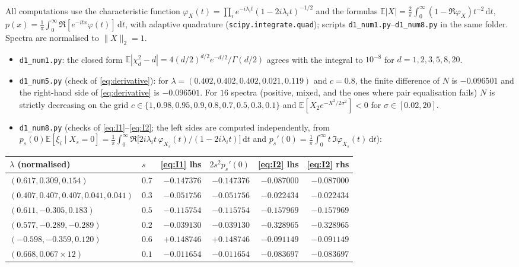 \documentclass[11pt]{article}
\theoremstyle{remark}
\newcommand{\E}{\mathbb{E}}
\newcommand{\dd}{\,\mathrm{d}}
\begin{document}
All computations use the characteristic function $\varphi_X(t)=\prod_i e^{-i\lambda_it}(1-2i\lambda_it)^{-1/2}$ and the formulas
$\E|X|=\frac2\pi\int_0^\infty(1-\Re\varphi_X)t^{-2}\dd t$, $p(x)=\frac1\pi\int_0^\infty\Re[e^{-itx}\varphi(t)]\dd t$, with adaptive quadrature
(\texttt{scipy.integrate.quad}); scripts \texttt{d1\_num1.py}--\texttt{d1\_num8.py} in the same folder. Spectra are normalised to $\|X\|_2=1$.
\begin{itemize}
\item \texttt{d1\_num1.py}: the closed form $\E|\chi_d^2-d|=4(d/2)^{d/2}e^{-d/2}/\Gamma(d/2)$ agrees with the integral to $10^{-8}$ for $d=1,2,3,5,8,20$.
\item \texttt{d1\_num5.py} (check of \eqref{eq:derivative}): for $\lambda=(0.402,0.402,0.402,0.021,0.119)$ and $c=0.8$, the finite difference of
$N$ is $-0.096501$ and the right-hand side of \eqref{eq:derivative} is $-0.096501$. For $16$ spectra (positive, mixed, and the ones where pair
equalisation fails) $N$ is strictly decreasing on the grid $c\in\{1,0.98,0.95,0.9,0.8,0.7,0.5,0.3,0.1\}$ and $\E[X_2e^{-X^2/2\sigma^2}]<0$ for
$\sigma\in[0.02,20]$.
\item \texttt{d1\_num8.py} (checks of \eqref{eq:I1}--\eqref{eq:I2}; the left sides are computed independently, from
$p_s(0)\E[\xi_i\mid X_s=0]=\frac1\pi\int_0^\infty\Re\big[2i\lambda_it\,\varphi_{X_s}(t)/(1-2i\lambda_it)\big]\dd t$ and
$p_s'(0)=\frac1\pi\int_0^\infty t\,\Im\varphi_{X_s}(t)\dd t$):
\end{itemize}
\begin{center}\small
\begin{tabular}{llrrrr}
\toprule
$\lambda$ (normalised) & $s$ & \eqref{eq:I1} lhs & $2s^2p_s'(0)$ & \eqref{eq:I2} lhs & \eqref{eq:I2} rhs\\
\midrule
$(0.617,0.309,0.154)$ & $0.7$ & $-0.147376$ & $-0.147376$ & $-0.087000$ & $-0.087000$\\
$(0.407,0.407,0.407,0.041,0.041)$ & $0.3$ & $-0.051756$ & $-0.051756$ & $-0.022434$ & $-0.022434$\\
$(0.611,-0.305,0.183)$ & $0.5$ & $-0.115754$ & $-0.115754$ & $-0.157969$ & $-0.157969$\\
$(0.577,-0.289,-0.289)$ & $0.2$ & $-0.039130$ & $-0.039130$ & $-0.328965$ & $-0.328965$\\
$(-0.598,-0.359,0.120)$ & $0.6$ & $+0.148746$ & $+0.148746$ & $-0.091149$ & $-0.091149$\\
$(0.668,0.067\times12)$ & $0.1$ & $-0.011654$ & $-0.011654$ & $-0.083697$ & $-0.083697$\\
\bottomrule
\end{tabular}
\end{center}
\end{document}
